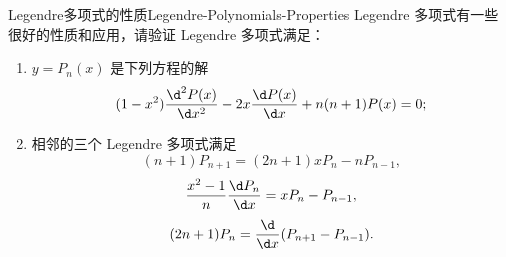 \begin{problem}{Legendre多项式的性质}{Legendre-Polynomials-Properties}
    Legendre 多项式有一些很好的性质和应用，请验证 Legendre 多项式满足：
    \begin{enumerate}
        \item $y = P_n(x)$ 是下列方程的解
              \begin{equation}\label{eq:legendre-ode-8}
                  (1 - x^2) \frac{\d^2 P(x)}{\d x^2} - 2x \frac{\d P(x)}{\d x} + n(n+1)P(x) = 0;
              \end{equation}
        \item 相邻的三个 Legendre 多项式满足
              \begin{equation}\label{eq:recurrence-8a}
                  (n+1)P_{n+1} = (2n+1)xP_n - nP_{n-1},
              \end{equation}
              \begin{equation}\label{eq:recurrence-8b}
                  \frac{x^2 - 1}{n} \frac{\d P_n}{\d x} = xP_n - P_{n-1},
              \end{equation}
              \begin{equation}\label{eq:recurrence-8c}
                  (2n+1)P_n = \frac{\d}{\d x}(P_{n+1} - P_{n-1}).
              \end{equation}
    \end{enumerate}
\end{problem}

